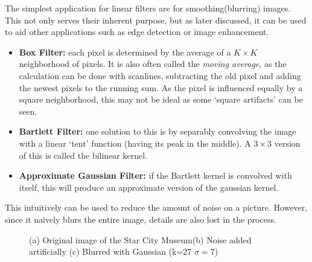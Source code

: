 \documentclass[twoside,a4paper,article]{combine}
\begin{document}
The simplest application for linear filters are for smoothing(blurring) images. This not only serves their inherent purpose, but as later discussed, it can be used to aid other applications such as
edge detection or image enhancement.
\begin{itemize}
    \item \textbf{Box Filter:} each pixel is determined by the average of a $K \times K$ 
        neighborhood of pixels. It is also often called the \emph{moving average}, as the calculation can be done with scanlines, subtracting the
        old pixel and adding the newest pixels to the running sum. As the pixel is influenced equally by a square neighborhood, this may not be ideal as some `square artifacts' can be seen.
    \item \textbf{Bartlett Filter:} one solution to this is by separably convolving the image
        with a linear `tent' function (having its peak in the middle). A $3\times 3$ version of this is called the bilinear kernel.
    \item \textbf{Approximate Gaussian Filter:} if the Bartlett kernel is convolved with itself, this will produce an approximate version of the gaussian kernel.
\end{itemize}

This intuitively can be used to reduce the amount of noise on a picture. However, since it naively blurs the entire image,
details are also lost in the process.\\
\begin{minipage}{\textwidth}\begin{figure}[H]
    \centering
    \caption{(a) Original image of the Star City Museum\cite{NASA_on_The_Commons_14}(b) Noise added artificially (c) Blurred with Gaussian (k=27 $\sigma=7$)}
    \label{fig:noise}
\end{figure}\end{minipage}
\end{document}
